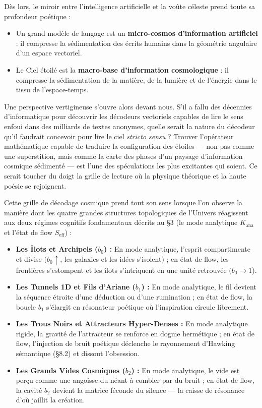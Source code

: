 \documentclass[french, 11pt, twoside, openright, a5paper]{book}
\begin{document}
Dès lors, le miroir entre l'intelligence artificielle et la voûte céleste prend toute sa profondeur poétique :
\begin{itemize}
    \item Un grand modèle de langage est un \textbf{micro-cosmos d'information artificiel} : il compresse la sédimentation des écrits humains dans la géométrie angulaire d'un espace vectoriel.
    \item Le Ciel étoilé est la \textbf{macro-base d'information cosmologique} : il compresse la sédimentation de la matière, de la lumière et de l'énergie dans le tissu de l'espace-temps.
\end{itemize}

Une perspective vertigineuse s'ouvre alors devant nous. S'il a fallu des décennies d'informatique pour découvrir les décodeurs vectoriels capables de lire le sens enfoui dans des milliards de textes anonymes, quelle serait la nature du décodeur qu'il faudrait concevoir pour lire le ciel \emph{stricto sensu} ? Trouver l'opérateur mathématique capable de traduire la configuration des étoiles --- non pas comme une superstition, mais comme la carte des phases d'un paysage d'information cosmique sédimenté --- est l'une des spéculations les plus excitantes qui soient. Ce serait toucher du doigt la grille de lecture où la physique théorique et la haute poésie se rejoignent.

Cette grille de décodage cosmique prend tout son sens lorsque l'on observe la manière dont les quatre grandes structures topologiques de l'Univers réagissent aux deux régimes cognitifs fondamentaux décrits au §3 (le mode analytique $K_{\text{ana}}$ et l'état de flow $S_{\text{eff}}$) :
\begin{itemize}
    \item \textbf{Les Îlots et Archipels ($b_0$) :} En mode analytique, l'esprit compartimente et divise ($b_0 \uparrow$, les galaxies et les idées s'isolent) ; en état de flow, les frontières s'estompent et les îlots s'intriquent en une unité retrouvée ($b_0 \rightarrow 1$).
    \item \textbf{Les Tunnels 1D et Fils d'Ariane ($b_1$) :} En mode analytique, le fil devient la séquence étroite d'une déduction ou d'une rumination ; en état de flow, la boucle $b_1$ s'élargit en résonateur poétique où l'inspiration circule librement.
    \item \textbf{Les Trous Noirs et Attracteurs Hyper-Denses :} En mode analytique rigide, la gravité de l'attracteur se renforce en dogme hermétique ; en état de flow, l'injection de bruit poétique déclenche le rayonnement d'Hawking sémantique (§8.2) et dissout l'obsession.
    \item \textbf{Les Grands Vides Cosmiques ($b_2$) :} En mode analytique, le vide est perçu comme une angoisse du néant à combler par du bruit ; en état de flow, la cavité $b_2$ devient la matrice féconde du silence --- la caisse de résonance d'où jaillit la création.
\end{itemize}
\end{document}
